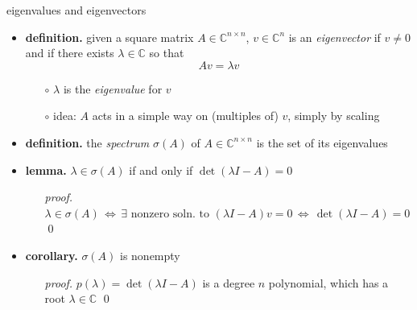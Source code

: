 \documentclass[10pt,hyperref]{beamer}
\newcommand{\CC}{\mathbb{C}}
\newcommand{\bqed}{{\color{blue}\qed}}
\begin{document}
\begin{frame}{eigenvalues and eigenvectors}

\begin{itemize}
\item \textbf{definition.}  given a square matrix $A \in \CC^{n\times n}$, $v\in\CC^n$ is an \emph{eigenvector} if $v\ne 0$ and if there exists $\lambda\in \CC$ so that
    $$A v = \lambda v$$

\vspace{-2mm}
    \begin{itemize}
    \item[$\circ$] $\lambda$ is the \emph{eigenvalue} for $v$
    \item[$\circ$] idea: $A$ acts in a simple way on (multiples of) $v$, simply by scaling
    \end{itemize}
\item \textbf{definition.}  the \emph{spectrum} $\sigma(A)$ of $A \in \CC^{n\times n}$ is the set of its eigenvalues
\item \textbf{lemma.} $\lambda\in\sigma(A)$ if and only if $\det(\lambda I - A)=0$
    \begin{itemize}
    \item[\emph{proof.}] $\lambda\in\sigma(A) \, \iff \, \exists \text{ nonzero soln.~to } (\lambda I - A) v = 0 \, \iff \, \det(\lambda I - A)=0$ \bqed
    \end{itemize}
\item \textbf{corollary.} $\sigma(A)$ is nonempty 
    \begin{itemize}
    \item[\emph{proof.}] $p(\lambda) = \det(\lambda I - A)$ is a degree $n$ polynomial, which has a root $\lambda\in\CC$ \bqed
    \end{itemize}
\end{itemize}
\end{frame}
\end{document}
